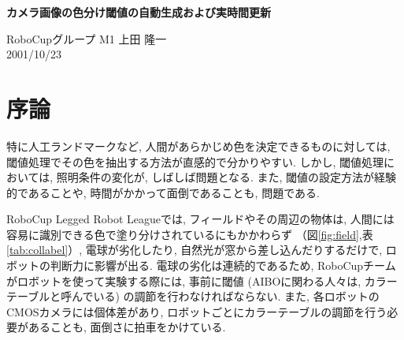 \documentclass[a4paper,11pt]{jarticle}
\begin{document}
	\begin{center}
		{\Large {\bfseries カメラ画像の色分け閾値の自動生成および実時間更新}}
	\end{center}
	\begin{flushright}
		RoboCupグループ  M1  上田 隆一  \\2001/10/23
	\end{flushright}

\section{序論}
特に人工ランドマークなど, 人間があらかじめ色を決定できるものに対しては,
閾値処理でその色を抽出する方法が直感的で分かりやすい. 
しかし, 閾値処理においては, 照明条件の変化が, しばしば問題となる. 
また, 閾値の設定方法が経験的であることや, 時間がかかって面倒であることも,
問題である. 


RoboCup Legged Robot Leagueでは, フィールドやその周辺の物体は,
人間には容易に識別できる色で塗り分けされているにもかかわらず
（図\ref{fig:field},表\ref{tab:collabel}）, 電球が劣化したり,
自然光が窓から差し込んだりするだけで, ロボットの判断力に影響が出る. 
電球の劣化は連続的であるため, RoboCupチームがロボットを使って実験する際には,
事前に閾値 (AIBOに関わる人々は, カラーテーブルと呼んでいる) 
の調節を行わなければならない. 
また, 各ロボットのCMOSカメラには個体差があり,
ロボットごとにカラーテーブルの調節を行う必要があることも,
面倒さに拍車をかけている. 
\end{document}
